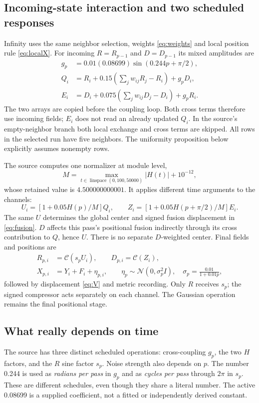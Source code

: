 \documentclass[11pt,a4paper]{article}
\newcommand{\C}{\mathcal{C}}
\begin{document}
\subsection{Incoming-state interaction and two scheduled responses}
Infinity uses the same neighbor selection, weights \eqref{eq:weights} and local position rule \eqref{eq:localX}. For incoming $R=R_{p-1}$ and $D=D_{p-1}$ its mixed amplitudes are
\begin{align}
g_p&=0.01(0.08699)\sin(0.244p+\pi/2),\label{eq:g}\\
Q_i&=R_i+0.15\left(\sum_jw_{ij}R_j-R_i\right)+g_pD_i,\label{eq:Q5}\\
E_i&=D_i+0.075\left(\sum_jw_{ij}D_j-D_i\right)+g_pR_i.\label{eq:E5}
\end{align}
The two arrays are copied before the coupling loop. Both cross terms therefore use incoming fields; $E_i$ does not read an already updated $Q_i$. In the source's empty-neighbor branch both local exchange and cross terms are skipped. All rows in the selected run have five neighbors. The uniformity proposition below explicitly assumes nonempty rows.

The source computes one normalizer at module level,
\begin{equation}
M=\max_{t\in\operatorname{linspace}(0,100,50000)}|H(t)|+10^{-12},\label{eq:M5}
\end{equation}
whose retained value is $4.500000000001$. It applies different time arguments to the channels:
\begin{equation}
U_i=[1+0.05H(p)/M]Q_i,\qquad
Z_i=[1+0.05H(p+\pi/2)/M]E_i.\label{eq:UZ5}
\end{equation}
The same $U$ determines the global center and signed fusion displacement in \eqref{eq:fusion}. $D$ affects this pass's positional fusion indirectly through its cross contribution to $Q$, hence $U$. There is no separate $D$-weighted center. Final fields and positions are
\begin{align}
R_{p,i}&=\C(s_pU_i),\qquad D_{p,i}=\C(Z_i),\label{eq:RD5}\\
X_{p,i}&=Y_i+F_i+\eta_{p,i},\qquad
\eta_p\sim\mathcal N(0,\sigma_p^2I),\quad \sigma_p=\frac{0.01}{1+0.01p},\label{eq:X5}
\end{align}
followed by displacement \eqref{eq:V} and metric recording. Only $R$ receives $s_p$; the signed compressor acts separately on each channel. The Gaussian operation remains the final positional stage.

\subsection{What really depends on time}
The source has three distinct scheduled operations: cross-coupling $g_p$, the two $H$ factors, and the $R$ sine factor $s_p$. Noise strength also depends on $p$. The number 0.244 is used as \emph{radians per pass} in $g_p$ and as \emph{cycles per pass} through $2\pi$ in $s_p$. These are different schedules, even though they share a literal number. The active 0.08699 is a supplied coefficient, not a fitted or independently derived constant.
\end{document}
